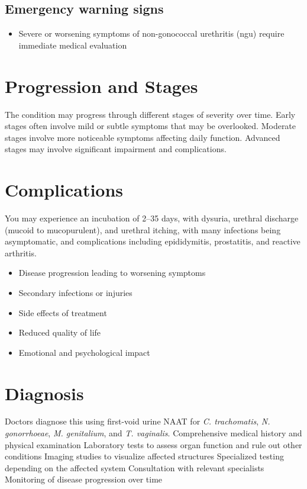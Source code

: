 \subsection{Emergency warning signs}
\begin{itemize}[noitemsep]
  \item Severe or worsening symptoms of non-gonococcal urethritis (ngu) require immediate medical evaluation
\end{itemize}
\section{Progression and Stages}
The condition may progress through different stages of severity over time. Early stages often involve mild or subtle symptoms that may be overlooked. Moderate stages involve more noticeable symptoms affecting daily function. Advanced stages may involve significant impairment and complications.
\section{Complications}
You may experience an incubation of 2--35 days, with dysuria, urethral discharge (mucoid to mucopurulent), and urethral itching, with many infections being asymptomatic, and complications including epididymitis, prostatitis, and reactive arthritis.

\begin{itemize}[noitemsep]
  \item Disease progression leading to worsening symptoms
  \item Secondary infections or injuries
  \item Side effects of treatment
  \item Reduced quality of life
  \item Emotional and psychological impact
\end{itemize}
\section{Diagnosis}
Doctors diagnose this using first-void urine NAAT for \textit{C. trachomatis}, \textit{N. gonorrhoeae}, \textit{M. genitalium}, and \textit{T. vaginalis}. Comprehensive medical history and physical examination Laboratory tests to assess organ function and rule out other conditions Imaging studies to visualize affected structures Specialized testing depending on the affected system Consultation with relevant specialists Monitoring of disease progression over time

